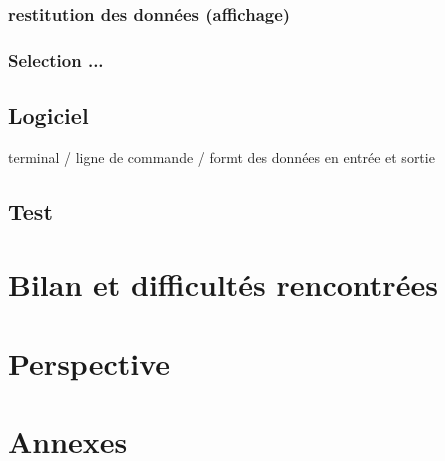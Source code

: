 \documentclass[oneside,13pt,a4paper]{report}
\begin{document}
\subsection{restitution des données (affichage)}

\subsection{Selection ...}

\section{Logiciel}

terminal / ligne de commande / formt des données en entrée et sortie

\section{Test}



\chapter{Bilan et difficultés rencontrées}


\chapter{Perspective}


\chapter{Annexes}
\end{document}
